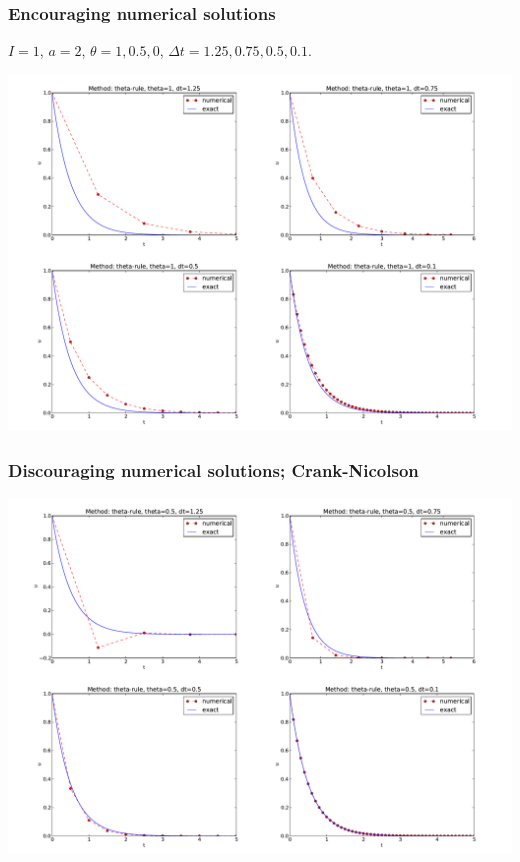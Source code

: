 \documentclass{beamer}
\begin{document}
\begin{frame}
\frametitle{Encouraging numerical solutions}

$I=1$, $a=2$, $\theta =1,0.5, 0$, $\Delta t=1.25, 0.75, 0.5, 0.1$.



\centerline{\includegraphics[width=1.1\linewidth]{fig-analysis/BE4c.pdf}}
\end{frame}

\begin{frame}
\frametitle{Discouraging numerical solutions; Crank-Nicolson}

\centerline{\includegraphics[width=1.1\linewidth]{fig-analysis/CN4c.pdf}}
\end{frame}
\end{document}
